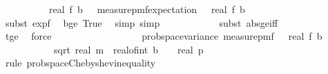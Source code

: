 \begin{isabellebody}
\ \ \ \ \ \ \ \ \ \ {\isasymbar}real\ {\isacharparenleft}{\kern0pt}f\ b\ {\isasymomega}{\isacharparenright}{\kern0pt}\ {\isacharminus}{\kern0pt}\ measure{\isacharunderscore}{\kern0pt}pmf{\isachardot}{\kern0pt}expectation\ {\isasymOmega}\ {\isacharparenleft}{\kern0pt}{\isasymlambda}{\isasymomega}{\isachardot}{\kern0pt}\ real\ {\isacharparenleft}{\kern0pt}f\ b\ {\isasymomega}{\isacharparenright}{\kern0pt}{\isacharparenright}{\kern0pt}{\isasymbar}{\isachardoublequoteclose}\ \ \isanewline
\ \ \ \ \ \ \ \ \ \ \isamarkupfalse%
\ {\isacharparenleft}{\kern0pt}subst\ exp{\isacharunderscore}{\kern0pt}f{\isacharparenright}{\kern0pt}\ \isamarkupfalse%
\ b{\isacharunderscore}{\kern0pt}ge{\isacharunderscore}{\kern0pt}{}\ True\ \isamarkupfalse%
\ {\isacharparenleft}{\kern0pt}simp{\isacharcomma}{\kern0pt}\ simp{\isacharparenright}{\kern0pt}\isanewline
\ \ \ \ \ \ \ \ \ \ \isamarkupfalse%
\ {\isacharparenleft}{\kern0pt}subst\ abs{\isacharunderscore}{\kern0pt}ge{\isacharunderscore}{\kern0pt}iff{\isacharparenright}{\kern0pt}\isanewline
\ \ \ \ \ \ \ \ \ \ \isamarkupfalse%
\ t{\isacharunderscore}{\kern0pt}ge\ \isamarkupfalse%
\ force\isanewline
\ \ \ \ \ \ \isamarkupfalse%
\isanewline
\ \ \ \ \ \ \isamarkupfalse%
\ \isamarkupfalse%
\ {\isachardoublequoteopen}{\isachardot}{\kern0pt}{\isachardot}{\kern0pt}{\isachardot}{\kern0pt}\ {\isasymle}\ prob{\isacharunderscore}{\kern0pt}space{\isachardot}{\kern0pt}variance\ {\isacharparenleft}{\kern0pt}measure{\isacharunderscore}{\kern0pt}pmf\ {\isasymOmega}\ {\isacharparenleft}{\kern0pt}{\isasymlambda}{\isasymomega}{\isachardot}{\kern0pt}\ real\ {\isacharparenleft}{\kern0pt}f\ b\ {\isasymomega}{\isacharparenright}{\kern0pt}{\isacharparenright}{\kern0pt}\ \isanewline
\ \ \ \ \ \ \ \ {\isacharslash}{\kern0pt}\ {\isacharparenleft}{\kern0pt}{}\ {\isacharasterisk}{\kern0pt}\ sqrt\ {\isacharparenleft}{\kern0pt}real\ m\ {\isacharasterisk}{\kern0pt}\ {\isacharparenleft}{\kern0pt}real{\isacharunderscore}{\kern0pt}of{\isacharunderscore}{\kern0pt}int\ b\ {\isacharplus}{\kern0pt}\ {}{\isacharparenright}{\kern0pt}\ {\isacharslash}{\kern0pt}\ real\ p{\isacharparenright}{\kern0pt}{\isacharparenright}{\kern0pt}\ \isanewline
\ \ \ \ \ \ \ \ \isamarkupfalse%
\ {\isacharparenleft}{\kern0pt}rule\ prob{\isacharunderscore}{\kern0pt}space{\isachardot}{\kern0pt}Chebyshev{\isacharunderscore}{\kern0pt}inequality{\isacharparenright}{\kern0pt}\isanewline

\end{isabellebody}
